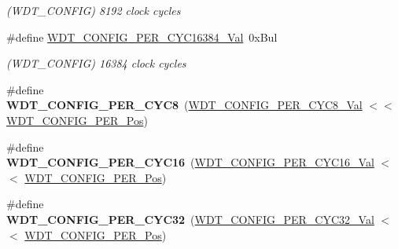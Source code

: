 \begin{DoxyCompactItemize}
\begin{DoxyCompactList}\small\item\em (W\+D\+T\+\_\+\+C\+O\+N\+F\+I\+G) 8192 clock cycles \end{DoxyCompactList}\item 
\hypertarget{group___s_a_m_l21___w_d_t_ga24efb4b1dd8e5db35e462f94bceaadec}{}\#define \hyperlink{group___s_a_m_l21___w_d_t_ga24efb4b1dd8e5db35e462f94bceaadec}{W\+D\+T\+\_\+\+C\+O\+N\+F\+I\+G\+\_\+\+P\+E\+R\+\_\+\+C\+Y\+C16384\+\_\+\+Val}~0x\+Bul\label{group___s_a_m_l21___w_d_t_ga24efb4b1dd8e5db35e462f94bceaadec}

\begin{DoxyCompactList}\small\item\em (W\+D\+T\+\_\+\+C\+O\+N\+F\+I\+G) 16384 clock cycles \end{DoxyCompactList}\item 
\hypertarget{group___s_a_m_l21___w_d_t_gae009b83dd619fd8d1a768d8ba0405a98}{}\#define {\bfseries W\+D\+T\+\_\+\+C\+O\+N\+F\+I\+G\+\_\+\+P\+E\+R\+\_\+\+C\+Y\+C8}~(\hyperlink{group___s_a_m_l21___w_d_t_gabcc004b82a9df108f7f9916d057943f4}{W\+D\+T\+\_\+\+C\+O\+N\+F\+I\+G\+\_\+\+P\+E\+R\+\_\+\+C\+Y\+C8\+\_\+\+Val}       $<$$<$ \hyperlink{group___s_a_m_l21___w_d_t_ga55662a2fa7e16fd6cc7a5e0800034360}{W\+D\+T\+\_\+\+C\+O\+N\+F\+I\+G\+\_\+\+P\+E\+R\+\_\+\+Pos})\label{group___s_a_m_l21___w_d_t_gae009b83dd619fd8d1a768d8ba0405a98}

\item 
\hypertarget{group___s_a_m_l21___w_d_t_gadb9f9b728aa813a74fecadb7dc46e742}{}\#define {\bfseries W\+D\+T\+\_\+\+C\+O\+N\+F\+I\+G\+\_\+\+P\+E\+R\+\_\+\+C\+Y\+C16}~(\hyperlink{group___s_a_m_l21___w_d_t_gafba76efe714284a6759149005d42e068}{W\+D\+T\+\_\+\+C\+O\+N\+F\+I\+G\+\_\+\+P\+E\+R\+\_\+\+C\+Y\+C16\+\_\+\+Val}      $<$$<$ \hyperlink{group___s_a_m_l21___w_d_t_ga55662a2fa7e16fd6cc7a5e0800034360}{W\+D\+T\+\_\+\+C\+O\+N\+F\+I\+G\+\_\+\+P\+E\+R\+\_\+\+Pos})\label{group___s_a_m_l21___w_d_t_gadb9f9b728aa813a74fecadb7dc46e742}

\item 
\hypertarget{group___s_a_m_l21___w_d_t_ga3fe9ded3475c51692423a24c4f391e5f}{}\#define {\bfseries W\+D\+T\+\_\+\+C\+O\+N\+F\+I\+G\+\_\+\+P\+E\+R\+\_\+\+C\+Y\+C32}~(\hyperlink{group___s_a_m_l21___w_d_t_gae718e0cf52132982208c6081d329f114}{W\+D\+T\+\_\+\+C\+O\+N\+F\+I\+G\+\_\+\+P\+E\+R\+\_\+\+C\+Y\+C32\+\_\+\+Val}      $<$$<$ \hyperlink{group___s_a_m_l21___w_d_t_ga55662a2fa7e16fd6cc7a5e0800034360}{W\+D\+T\+\_\+\+C\+O\+N\+F\+I\+G\+\_\+\+P\+E\+R\+\_\+\+Pos})\label{group___s_a_m_l21___w_d_t_ga3fe9ded3475c51692423a24c4f391e5f}


\end{DoxyCompactItemize}
